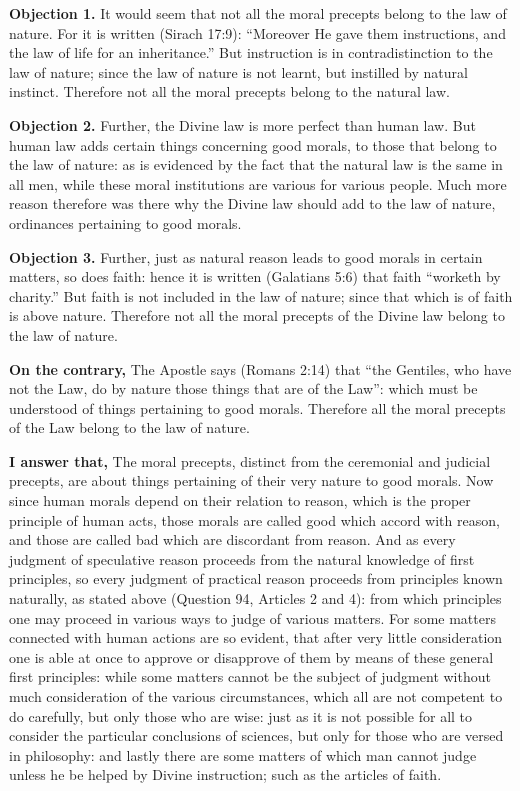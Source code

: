 
\textbf{Objection 1.} It would seem that not all the moral precepts belong to the law of nature. For it is written (Sirach 17:9): ``Moreover He gave them instructions, and the law of life for an inheritance.'' But instruction is in contradistinction to the law of nature; since the law of nature is not learnt, but instilled by natural instinct. Therefore not all the moral precepts belong to the natural law.

\textbf{Objection 2.} Further, the Divine law is more perfect than human law. But human law adds certain things concerning good morals, to those that belong to the law of nature: as is evidenced by the fact that the natural law is the same in all men, while these moral institutions are various for various people. Much more reason therefore was there why the Divine law should add to the law of nature, ordinances pertaining to good morals.

\textbf{Objection 3.} Further, just as natural reason leads to good morals in certain matters, so does faith: hence it is written (Galatians 5:6) that faith ``worketh by charity.'' But faith is not included in the law of nature; since that which is of faith is above nature. Therefore not all the moral precepts of the Divine law belong to the law of nature.

\textbf{On the contrary,} The Apostle says (Romans 2:14) that ``the Gentiles, who have not the Law, do by nature those things that are of the Law'': which must be understood of things pertaining to good morals. Therefore all the moral precepts of the Law belong to the law of nature.

\textbf{I answer that,} The moral precepts, distinct from the ceremonial and judicial precepts, are about things pertaining of their very nature to good morals. Now since human morals depend on their relation to reason, which is the proper principle of human acts, those morals are called good which accord with reason, and those are called bad which are discordant from reason. And as every judgment of speculative reason proceeds from the natural knowledge of first principles, so every judgment of practical reason proceeds from principles known naturally, as stated above (Question 94, Articles 2 and 4): from which principles one may proceed in various ways to judge of various matters. For some matters connected with human actions are so evident, that after very little consideration one is able at once to approve or disapprove of them by means of these general first principles: while some matters cannot be the subject of judgment without much consideration of the various circumstances, which all are not competent to do carefully, but only those who are wise: just as it is not possible for all to consider the particular conclusions of sciences, but only for those who are versed in philosophy: and lastly there are some matters of which man cannot judge unless he be helped by Divine instruction; such as the articles of faith.

